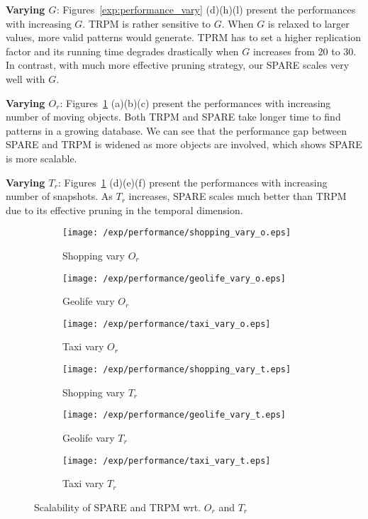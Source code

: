 \textbf{Varying $G$}: Figures~\ref{exp:performance_vary} (d)(h)(l) present the performances with increasing $G$.  TRPM is rather sensitive to $G$. When $G$ is relaxed to larger values, more valid patterns would generate. TPRM has to set a higher replication factor and its running time degrades drastically when $G$ increases from $20$ to $30$. In contrast, with much more effective pruning strategy, our SPARE scales very well with $G$.

\textbf{Varying $O_r$}: Figures~\ref{exp:performance_vary_OT} (a)(b)(c) present 
the performances with increasing number of moving objects. Both TRPM and SPARE take longer time to find patterns in a growing database. We can see that the performance gap between SPARE and TRPM is widened as more objects are involved, which shows SPARE is more scalable.

\textbf{Varying $T_r$}: Figures~\ref{exp:performance_vary_OT} (d)(e)(f) present 
the performances with increasing number of snapshots. As $T_r$ increases, SPARE scales much better than TRPM due to its effective pruning in the temporal dimension. 

\begin{figure}[h]
\centering
	\begin{subfigure}[b]{0.22\textwidth}
	 \texttt{[image: /exp/performance/shopping\_vary\_o.eps]}
        \caption{Shopping vary $O_r$}
    \end{subfigure}
 	 \begin{subfigure}[b]{0.22\textwidth}
        \texttt{[image: /exp/performance/geolife\_vary\_o.eps]}
        \caption{Geolife vary $O_r$}
    \end{subfigure}
    	 \begin{subfigure}[b]{0.22\textwidth}
        \texttt{[image: /exp/performance/taxi\_vary\_o.eps]}
        \caption{Taxi vary $O_r$}
    \end{subfigure}
    \begin{subfigure}[b]{0.22\textwidth}
	 \texttt{[image: /exp/performance/shopping\_vary\_t.eps]}
        \caption{Shopping vary $T_r$}
    \end{subfigure}
 	 \begin{subfigure}[b]{0.22\textwidth}
        \texttt{[image: /exp/performance/geolife\_vary\_t.eps]}
        \caption{Geolife vary $T_r$}
    \end{subfigure}
    	 \begin{subfigure}[b]{0.22\textwidth}
        \texttt{[image: /exp/performance/taxi\_vary\_t.eps]}
        \caption{Taxi vary $T_r$}
    \end{subfigure}
 \caption{Scalability of SPARE and TRPM wrt. $O_r$ and $T_r$}
 \label{exp:performance_vary_OT}
\end{figure}



